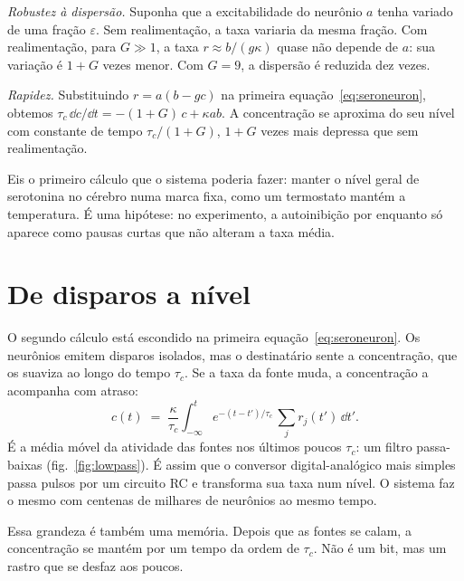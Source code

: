 \emph{Robustez à dispersão.} Suponha que a excitabilidade do neurônio $a$ tenha variado de uma fração $\varepsilon$. Sem realimentação, a taxa variaria da mesma fração. Com realimentação, para $G\gg1$, a taxa $r\approx b/(g\kappa)$ quase não depende de $a$: sua variação é $1+G$ vezes menor. Com $G=9$, a dispersão é reduzida dez vezes.

\emph{Rapidez.} Substituindo $r=a(b-gc)$ na primeira equação~\eqref{eq:seroneuron}, obtemos $\tau_c\,\dd c/\dd t=-(1+G)\,c+\kappa ab$. A concentração se aproxima do seu nível com constante de tempo $\tau_c/(1+G)$, $1+G$ vezes mais depressa que sem realimentação.

Eis o primeiro cálculo que o sistema  poderia fazer: manter o nível geral de serotonina no cérebro numa marca fixa, como um termostato mantém a temperatura. É uma hipótese: no experimento, a autoinibição por enquanto só aparece como pausas curtas que não alteram a taxa média.

\section{De disparos a nível}

O segundo cálculo está escondido na primeira equação~\eqref{eq:seroneuron}. Os neurônios emitem disparos isolados, mas o destinatário sente a concentração, que os suaviza ao longo do tempo $\tau_c$. Se a taxa da fonte muda, a concentração a acompanha com atraso:
\begin{equation}
c(t) \;=\; \frac{\kappa}{\tau_c}\int_{-\infty}^{t} e^{-(t-t')/\tau_c}\,\sum_j r_j(t')\,\dd t' .
\label{eq:lowpass}
\end{equation}
É a média móvel da atividade das fontes nos últimos poucos $\tau_c$: um filtro passa-baixas (fig.~\ref{fig:lowpass}). É assim que o conversor digital-analógico mais simples passa pulsos por um circuito RC e transforma sua taxa num nível. O sistema  faz o mesmo com centenas de milhares de neurônios ao mesmo tempo.

Essa grandeza é também uma memória. Depois que as fontes se calam, a concentração se mantém por um tempo da ordem de $\tau_c$. Não é um bit, mas um rastro que se desfaz aos poucos.

